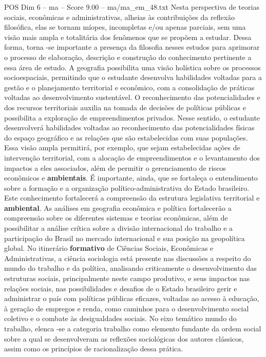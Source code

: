 \begin{textsample}{POS Dim 6 – ma – Score 9.00 – ma/ma\_em\_48.txt}
Nesta perspectiva de teorias sociais, econômicas e administrativas, alheias às contribuições da reflexão filosófica, elas se tornam míopes, incompletas e/ou apenas parciais, sem uma visão mais ampla e totalitária dos fenômenos que se propõem a estudar.
Dessa forma, torna -se importante a presença da filosofia nesses estudos para aprimorar o processo de elaboração, descrição e construção do conhecimento pertinente a essa área de estudo.
A geografia possibilita uma visão holística sobre os processos socioespaciais, permitindo que o estudante desenvolva habilidades voltadas para a gestão e o planejamento territorial e econômico, com a consolidação de práticas voltadas ao desenvolvimento sustentável.
O reconhecimento das potencialidades e dos recursos territoriais auxilia na tomada de decisões de políticas públicas e possibilita a exploração de empreendimentos privados.
Nesse sentido, o estudante desenvolverá habilidades voltadas ao reconhecimento das potencialidades físicas do espaço geográfico e as relações que são estabelecidas com suas populações.
Essa visão ampla permitirá, por exemplo, que sejam estabelecidas ações de intervenção territorial, com a alocação de empreendimentos e o levantamento dos impactos a eles associados, além de permitir o gerenciamento de riscos econômicos e \textbf{ambientais}.
É importante, ainda, que se fortaleça o entendimento sobre a formação e a organização político-administrativa do Estado brasileiro.
Este conhecimento fortalecerá a compreensão da estrutura legislativa territorial e \textbf{ambiental}.
As análises em geografia econômica e política fortalecerão a compreensão sobre os diferentes sistemas e teorias econômicas, além de possibilitar a análise crítica sobre a divisão internacional do trabalho e a participação do Brasil no mercado internacional e sua posição na geopolítica global.
No itinerário \textbf{formativo} de Ciências Sociais, Econômicas e Administrativas, a ciência sociologia está presente nas discussões a respeito do mundo do trabalho e da política, analisando criticamente o desenvolvimento das estruturas sociais, principalmente neste campo produtivo, e seus impactos nas relações sociais, nas possibilidades e desafios de o Estado brasileiro gerir e administrar o país com políticas públicas eficazes, voltadas ao acesso à educação, à geração de empregos e renda, como caminhos para o desenvolvimento social coletivo e o combate às desigualdades sociais.
No eixo temático mundo do trabalho, elenca -se a categoria trabalho como elemento fundante da ordem social sobre a qual se desenvolveram as reflexões sociológicas dos autores clássicos, assim como os princípios de racionalização dessa prática.

\end{textsample}
